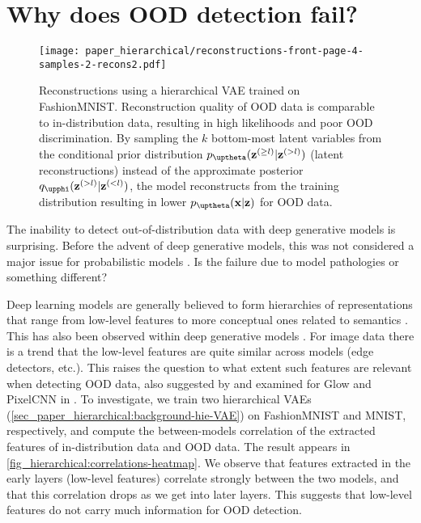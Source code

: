 {\section{Why does OOD detection fail?}\label{sec_paper_hierarchical:why-does-ood-fail}
\begin{figure}
    \centering
    \texttt{[image: paper\_hierarchical/reconstructions-front-page-4-samples-2-recons2.pdf]}
    \caption[Reconstructions of a hierarchical VAE trained on FashionMNIST.]{ Reconstructions using a hierarchical VAE trained on FashionMNIST.
        Reconstruction quality of OOD data is comparable to in-distribution data, resulting in high likelihoods and poor OOD discrimination.
        By sampling the $k$ bottom-most latent variables from the conditional prior distribution $p_\thetab(\zb^{(\geq l)}|\zb^{(>l)})$ (latent reconstructions) instead of the approximate posterior $q_\phib(\zb^{(>l)}|\zb^{(<l)})$, the model reconstructs from the training distribution resulting in lower $p_\thetab(\xb|\zb)$ for OOD data.
    }
    \label{fig_hierarchical:reconstructions-fashionmnist}
\end{figure}
%
The inability to detect out-of-distribution data with deep generative models is surprising.
Before the advent of deep generative models, this was not considered a major issue for probabilistic models \parencite{bishop_novelty_1994}. 
Is the failure due to model pathologies or something different?

Deep learning models are generally believed to form hierarchies of representations that range from low-level features to more conceptual ones related to semantics \parencite{bengio_representation_2013}.
This has also been observed within deep generative models \parencite{maaloe_biva_2019, child_very_2021}.
For image data there is a trend that the low-level features are quite similar across models (edge detectors, etc.). This raises the question to what extent such features are relevant when detecting OOD data, also suggested  by \parencite{nalisnick_deep_2019} and examined for Glow and PixelCNN in \parencite{schirrmeister_understanding_2020}.
To investigate, we train two hierarchical VAEs (\cref{sec_paper_hierarchical:background-hie-VAE}) on FashionMNIST and MNIST, respectively, and compute the between-models correlation of the extracted features of in-distribution data and OOD data.
The result appears in \cref{fig_hierarchical:correlations-heatmap}.
We observe that features extracted in the early layers (low-level features) correlate strongly between the two models, and that this correlation drops as we get into later layers.
This suggests that low-level features do not carry much information for OOD detection.

}
